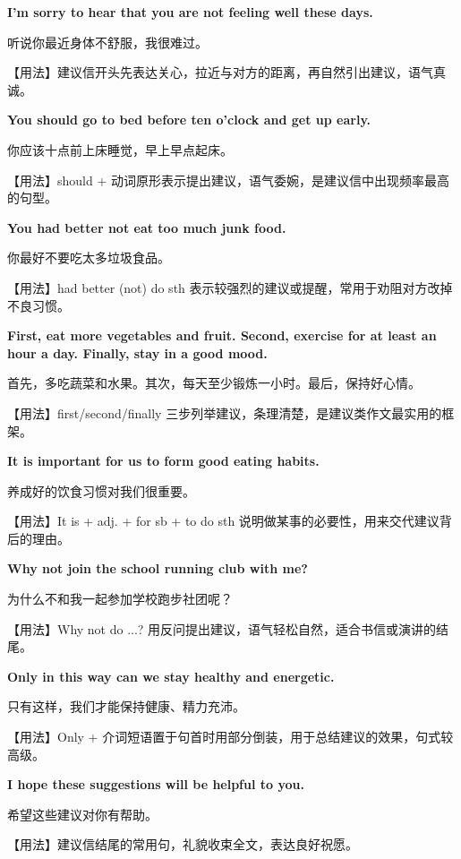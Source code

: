 \documentclass[UTF8,a4paper,11pt,oneside]{ctexbook}
\newcommand{\fansection}[1]{%
  \par\addvspace{2.4ex}%
  \Needspace{6\baselineskip}%
  \noindent{\sffamily\Large\bfseries\color{mainblue}#1}\par
  \nopagebreak
  \addvspace{0.2ex}%
  \noindent{\color{rulelight}\rule{\linewidth}{0.9pt}}\par
  \addvspace{0.9ex}%
  \nobreak
}
\newcommand{\fanpat}[3]{%
  \item{\bfseries #1}\par\nopagebreak
  {\small\color{textgray}#2}\par\nopagebreak
  {\footnotesize\color{accent!90!black}【用法】#3}\par
}
\begin{document}
\fansection{〇、本单元写作常用句型}
\begin{fanpatterns}
\fanpat{I'm sorry to hear that you are not feeling well these days.}{听说你最近身体不舒服，我很难过。}{建议信开头先表达关心，拉近与对方的距离，再自然引出建议，语气真诚。}

\fanpat{You should go to bed before ten o'clock and get up early.}{你应该十点前上床睡觉，早上早点起床。}{should + 动词原形表示提出建议，语气委婉，是建议信中出现频率最高的句型。}

\fanpat{You had better not eat too much junk food.}{你最好不要吃太多垃圾食品。}{had better (not) do sth 表示较强烈的建议或提醒，常用于劝阻对方改掉不良习惯。}

\fanpat{First, eat more vegetables and fruit. Second, exercise for at least an hour a day. Finally, stay in a good mood.}{首先，多吃蔬菜和水果。其次，每天至少锻炼一小时。最后，保持好心情。}{first/second/finally 三步列举建议，条理清楚，是建议类作文最实用的框架。}

\fanpat{It is important for us to form good eating habits.}{养成好的饮食习惯对我们很重要。}{It is + adj. + for sb + to do sth 说明做某事的必要性，用来交代建议背后的理由。}

\fanpat{Why not join the school running club with me?}{为什么不和我一起参加学校跑步社团呢？}{Why not do ...? 用反问提出建议，语气轻松自然，适合书信或演讲的结尾。}

\fanpat{Only in this way can we stay healthy and energetic.}{只有这样，我们才能保持健康、精力充沛。}{Only + 介词短语置于句首时用部分倒装，用于总结建议的效果，句式较高级。}

\fanpat{I hope these suggestions will be helpful to you.}{希望这些建议对你有帮助。}{建议信结尾的常用句，礼貌收束全文，表达良好祝愿。}

\end{fanpatterns}

\fansection{一、满分范文}
\end{document}
